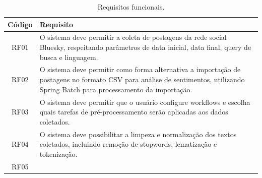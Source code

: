 \documentclass[
	12pt,				%
	oneside,			%
	a4paper,			%
	english,			%
	french,				%
	spanish,			%
	brazil				%
	]{abntex2}
\def\toprule{\hlineB{3}} %
\def\midrule{\hline}
\begin{document}
\renewcommand\LTcaptype{quadro}
\begin{longtable}[]{|c|l|}
\caption{Requisitos funcionais.\label{requisitos_funcionais}}\tabularnewline
\toprule
\begin{minipage}[b]{0.07\columnwidth}\centering
Código\strut
\end{minipage} & \begin{minipage}[b]{0.87\columnwidth}\raggedright
Requisito\strut
\end{minipage}\tabularnewline
\midrule
\endhead
\begin{minipage}[t]{0.07\columnwidth}\centering
RF01\strut
\end{minipage} & \begin{minipage}[t]{0.87\columnwidth}\raggedright
O sistema deve permitir a coleta de postagens da rede social Bluesky, respeitando parâmetros de data inicial, data final, query de busca e linguagem.\strut
\end{minipage}\tabularnewline
\begin{minipage}[t]{0.07\columnwidth}\centering
RF02\strut
\end{minipage} & \begin{minipage}[t]{0.87\columnwidth}\raggedright
O sistema deve permitir como forma alternativa a importação de postagens no formato CSV para análise de sentimentos, utilizando Spring Batch para processamento da importação.\strut
\end{minipage}\tabularnewline
\begin{minipage}[t]{0.07\columnwidth}\centering
RF03\strut
\end{minipage} & \begin{minipage}[t]{0.87\columnwidth}\raggedright
O sistema deve permitir que o usuário configure workflows e escolha quais tarefas de pré-processamento serão aplicadas aos dados coletados.\strut
\end{minipage}\tabularnewline
\begin{minipage}[t]{0.07\columnwidth}\centering
RF04\strut
\end{minipage} & \begin{minipage}[t]{0.87\columnwidth}\raggedright
O sistema deve possibilitar a limpeza e normalização dos textos coletados, incluindo remoção de stopwords, lematização e tokenização.\strut
\end{minipage}\tabularnewline
\begin{minipage}[t]{0.07\columnwidth}\centering
RF05\strut
\end{minipage} & \begin{minipage}[t]{0.87\columnwidth}\raggedright

\end{minipage}
\end{longtable}
\end{document}

